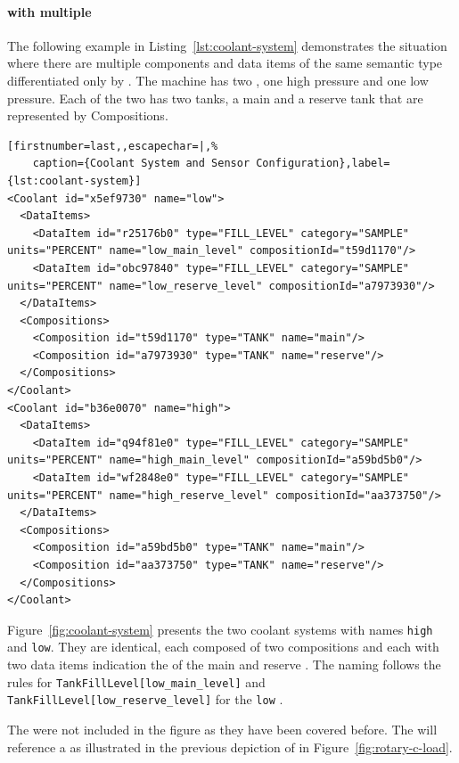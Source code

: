 \FloatBarrier

\paragraph{  with multiple }

The following example in Listing~\ref{lst:coolant-system} demonstrates the situation where there are multiple components and data items of the same semantic type differentiated only by . The machine has two  , one high pressure and one low pressure. Each of the two   has two tanks, a main and a reserve tank that are represented by \glspl{Composition}. 

\begin{lstlisting}[firstnumber=last,,escapechar=|,%
    caption={Coolant System and Sensor Configuration},label={lst:coolant-system}]
<Coolant id="x5ef9730" name="low">
  <DataItems>
    <DataItem id="r25176b0" type="FILL_LEVEL" category="SAMPLE" units="PERCENT" name="low_main_level" compositionId="t59d1170"/>
    <DataItem id="obc97840" type="FILL_LEVEL" category="SAMPLE" units="PERCENT" name="low_reserve_level" compositionId="a7973930"/>
  </DataItems>
  <Compositions>
    <Composition id="t59d1170" type="TANK" name="main"/>
    <Composition id="a7973930" type="TANK" name="reserve"/>
  </Compositions>
</Coolant>
<Coolant id="b36e0070" name="high">
  <DataItems>
    <DataItem id="q94f81e0" type="FILL_LEVEL" category="SAMPLE" units="PERCENT" name="high_main_level" compositionId="a59bd5b0"/>
    <DataItem id="wf2848e0" type="FILL_LEVEL" category="SAMPLE" units="PERCENT" name="high_reserve_level" compositionId="aa373750"/>
  </DataItems>
  <Compositions>
    <Composition id="a59bd5b0" type="TANK" name="main"/>
    <Composition id="aa373750" type="TANK" name="reserve"/>
  </Compositions>
</Coolant>
\end{lstlisting}

Figure~\ref{fig:coolant-system} presents the two coolant systems with names \texttt{high} and \texttt{low}. They are identical, each composed of two  compositions and each with two data items indication the  of the main and reserve . The naming follows the rules for \texttt{TankFillLevel[low_main_level]} and \texttt{TankFillLevel[low_reserve_level]} for the \texttt{low} . 

The  were not included in the figure as they have been covered before. The   will reference a    as illustrated in the previous depiction of  in Figure~\ref{fig:rotary-c-load}.

